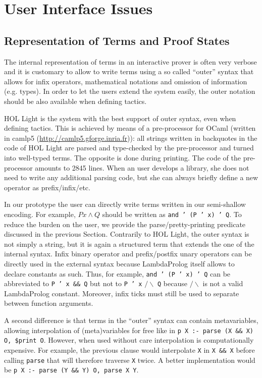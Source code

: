 \documentclass[preprint]{sigplanconf}
\begin{document}
\section{User Interface Issues}
\subsection{Representation of Terms and Proof States}
The internal representation of terms in an interactive prover is often very verbose and it is customary to allow to write terms using a so called ``outer'' syntax that allows for infix operators, mathematical notations and omission of information (e.g. types). In order to let the users extend the system easily, the outer notation should be also available when defining tactics.

HOL Light is the system with the best support of outer syntax, even when defining tactics. This is achieved by means of a pre-processor for OCaml (written in camlp5 (\url{http://camlp5.gforge.inria.fr})): all strings written in backquotes in the code of HOL Light are parsed and type-checked by the pre-processor and turned into well-typed terms. The opposite is done during printing. The code of the pre-processor amounts to 2845 lines. When an user develops a library, she does not need to write any additional parsing code, but she can always briefly define a new operator as prefix/infix/etc.

In our prototype the user can directly write terms written in our semi-shallow encoding. For example, $P x \wedge Q$ should be written as \texttt{and ' (P ' x) ' Q}. To reduce the burden on the user, we provide the parse/pretty-printing predicate discussed in the previous Section. Contrarily to HOL Light, the outer syntax is not simply a string, but it is again a structured term that extends the one of the internal syntax. Infix binary operator and prefix/postfix unary operators can be directly used in the external syntax because LambdaProlog itself allows to declare constants as such. Thus, for example, \texttt{and ' (P ' x) ' Q} can be abbreviated to \texttt{P ' x \&\& Q} but not to \texttt{P ' x} $/\backslash$ \texttt{Q} because $/\backslash$ is not a valid LambdaProlog constant. Moreover, infix ticks must still be used to separate between function arguments.

A second difference  is that terms in the ``outer'' syntax can contain metavariables, allowing interpolation of (meta)variables for free like in \texttt{p X :- parse (X \&\& X) O, \$print O}. However, when used without care interpolation is computationally expensive. For example, the previous clause would interpolate \verb+X+ in \verb+X && X+ before calling \verb+parse+ that will therefore traverse \verb+X+ twice. A better implementation would be \texttt{p X :- parse (Y \&\& Y) O, parse X Y}.
\end{document}
